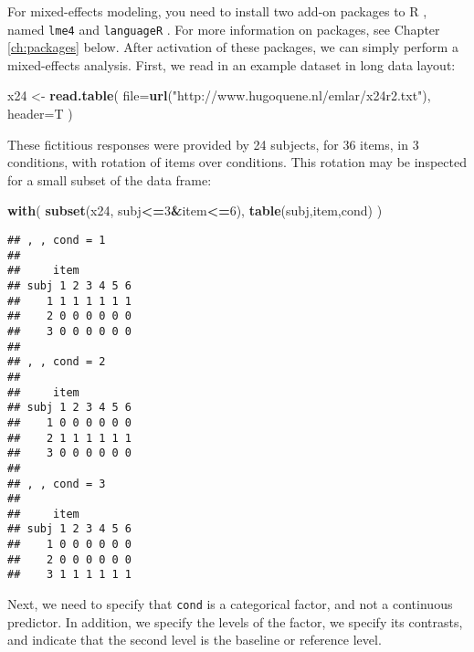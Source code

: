 \documentclass[]{book}
\newenvironment{Shaded}{\begin{snugshade}}{\end{snugshade}}
\newcommand{\DataTypeTok}[1]{\textcolor[rgb]{0.13,0.29,0.53}{#1}}
\newcommand{\DecValTok}[1]{\textcolor[rgb]{0.00,0.00,0.81}{#1}}
\newcommand{\KeywordTok}[1]{\textcolor[rgb]{0.13,0.29,0.53}{\textbf{#1}}}
\newcommand{\NormalTok}[1]{#1}
\newcommand{\OperatorTok}[1]{\textcolor[rgb]{0.81,0.36,0.00}{\textbf{#1}}}
\newcommand{\StringTok}[1]{\textcolor[rgb]{0.31,0.60,0.02}{#1}}
\begin{document}
For mixed-effects modeling, you need to install two add-on packages to
R , named \texttt{lme4} and \texttt{languageR} \citep{BDB08}. For more
information on packages, see Chapter \ref{ch:packages} below.
After activation of these packages, we
can simply perform a mixed-effects analysis. First, we read in an
example dataset \citep{QB08} in long data layout:

\begin{Shaded}
\begin{Highlighting}[]
\NormalTok{x24 <-}\StringTok{ }\KeywordTok{read.table}\NormalTok{( }\DataTypeTok{file=}\KeywordTok{url}\NormalTok{(}\StringTok{"http://www.hugoquene.nl/emlar/x24r2.txt"}\NormalTok{), }\DataTypeTok{header=}\NormalTok{T )}
\end{Highlighting}
\end{Shaded}

These fictitious responses were provided by 24 subjects, for 36 items,
in 3 conditions, with rotation of items over conditions. This rotation
may be inspected for a small subset of the data frame:

\begin{Shaded}
\begin{Highlighting}[]
\KeywordTok{with}\NormalTok{( }\KeywordTok{subset}\NormalTok{(x24, subj}\OperatorTok{<=}\DecValTok{3}\OperatorTok{&}\NormalTok{item}\OperatorTok{<=}\DecValTok{6}\NormalTok{), }\KeywordTok{table}\NormalTok{(subj,item,cond) ) }
\end{Highlighting}
\end{Shaded}

\begin{verbatim}
## , , cond = 1
## 
##     item
## subj 1 2 3 4 5 6
##    1 1 1 1 1 1 1
##    2 0 0 0 0 0 0
##    3 0 0 0 0 0 0
## 
## , , cond = 2
## 
##     item
## subj 1 2 3 4 5 6
##    1 0 0 0 0 0 0
##    2 1 1 1 1 1 1
##    3 0 0 0 0 0 0
## 
## , , cond = 3
## 
##     item
## subj 1 2 3 4 5 6
##    1 0 0 0 0 0 0
##    2 0 0 0 0 0 0
##    3 1 1 1 1 1 1
\end{verbatim}

Next, we need to specify that \texttt{cond} is a
categorical factor, and not a continuous predictor. In addition, we
specify the levels of the factor, we specify its contrasts, and indicate
that the second level is the baseline or reference level.

\begin{Shaded}
\end{Shaded}
\end{document}
